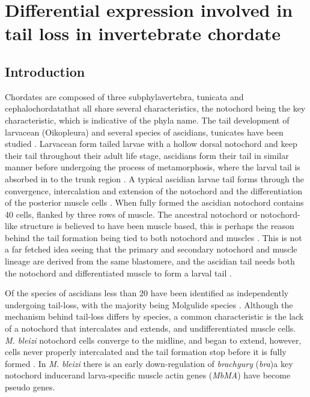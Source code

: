 \chapter{Differential expression involved in tail loss in invertebrate chordate}

\section{Introduction}

Chordates are composed of three subphyla\textemdash vertebra, tunicata and cephalochordata\textemdash that all share several characteristics, the notochord being the key characteristic, which is indicative of the phyla name. The tail development of larvacean (Oikopleura) and several species of ascidians, tunicates have been studied \cite{jeffery_factors_1992,nakatani_mutations_1999,kugler_evolutionary_2011}. Larvacean form tailed larvae with a hollow dorsal notochord and keep their tail throughout their adult life stage, ascidians form their tail in similar manner before undergoing the process of metamorphosis, where the larval tail is absorbed in to the trunk region \cite{paris_history_2008}. A typical ascidian larvae tail forms through the convergence, intercalation and extension of the notochord and the differentiation of the posterior muscle cells \cite{swalla_mechanisms_1993}. When fully formed the ascidian notochord contains 40 cells, flanked by three rows of muscle. The ancestral notochord or notochord-like structure is believed to have been muscle based, this is perhaps the reason behind the tail formation being tied to both notochord and muscles \cite{lauri_development_2014}. This is not a far fetched idea seeing that the primary and secondary notochord and muscle lineage are derived from the same blastomere, and the ascidian tail needs both the notochord and differentiated muscle to form a larval tail \cite{nishida_cell_1987,di_gregorio_tail_2002}.

Of the  species of ascidians less than 20 have been identified as independently undergoing tail-loss, with the majority being Molgulide species \cite{berrill_studies_1931,huber_evolution_2000}. Although the mechanism behind tail-loss differs by species, a common characteristic is the lack of a notochord that intercalates and extends, and undifferentiated muscle cells\cite{swalla_mechanisms_1993}. \textit{M. bleizi} notochord cells converge to the midline, and began to extend, however, cells never properly intercalated and the tail formation stop before it is fully formed \cite{jeffery_evolution_1999}. In \textit{M. bleizi} there is an early down-regulation of \textit{brachyury} (\textit{bra})\textemdash a key notochord inducer\textemdash and larva-specific muscle actin genes (\textit{MbMA}) have become pseudo genes.   

